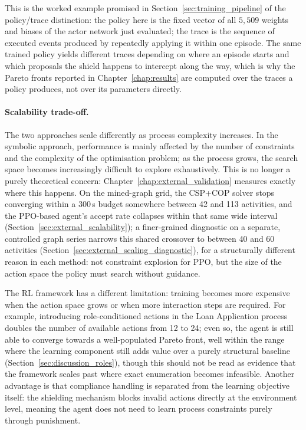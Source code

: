 This is the worked example promised in Section~\ref{sec:training_pipeline} of the policy/trace distinction: the policy here is the fixed vector of all $5{,}509$ weights and biases of the actor network just evaluated; the trace is the sequence of executed events produced by repeatedly applying it within one episode. The same trained policy yields different traces depending on where an episode starts and which proposals the shield happens to intercept along the way, which is why the Pareto fronts reported in Chapter~\ref{chap:results} are computed over the traces a policy produces, not over its parameters directly.

\paragraph{Scalability trade-off.} The two approaches scale differently as process complexity increases. In the symbolic approach, performance is mainly affected by the number of constraints and the complexity of the optimisation problem; as the process grows, the search space becomes increasingly difficult to explore exhaustively. This is no longer a purely theoretical concern: Chapter~\ref{chap:external_validation} measures exactly where this happens. On the mined-graph grid, the CSP+COP solver stops converging within a 300\,s budget somewhere between 42 and 113 activities, and the \ac{PPO}-based agent's accept rate collapses within that same wide interval (Section~\ref{sec:external_scalability}); a finer-grained diagnostic on a separate, controlled graph series narrows this shared crossover to between 40 and 60 activities (Section~\ref{sec:external_scaling_diagnostic}), for a structurally different reason in each method: not constraint explosion for \ac{PPO}, but the size of the action space the policy must search without guidance.

The \ac{RL} framework has a different limitation: training becomes more expensive when the action space grows or when more interaction steps are required. For example, introducing role-conditioned actions in the Loan Application process doubles the number of available actions from 12 to 24; even so, the agent is still able to converge towards a well-populated Pareto front, well within the range where the learning component still adds value over a purely structural baseline (Section~\ref{sec:discussion_roles}), though this should not be read as evidence that the framework scales past where exact enumeration becomes infeasible. Another advantage is that compliance handling is separated from the learning objective itself: the shielding mechanism blocks invalid actions directly at the environment level, meaning the agent does not need to learn process constraints purely through punishment.

